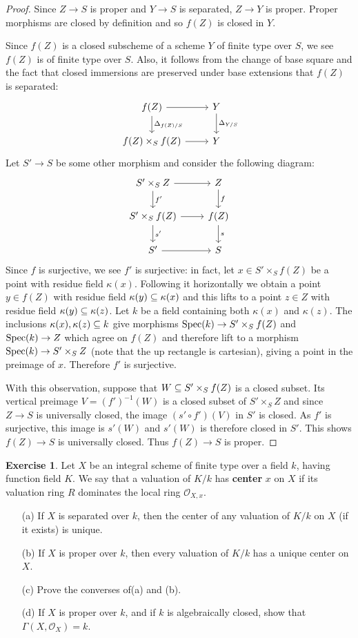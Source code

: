 \documentclass[11pt]{book}
\theoremstyle{definition}
\newtheorem{exercise}{Exercise}[section]
\begin{document}
\begin{proof}
Since $Z\to S$ is proper and $Y\to S$ is separated, $Z\to Y$ is proper. Proper morphisms are closed by definition and so $f(Z)$ is closed in $Y$.\par
Since $f(Z)$ is a closed subscheme of a scheme $Y$ of finite type over $S$, we see $f(Z)$ is of finite type over $S$. Also, it follows from the change of base square and the fact that closed immersions are preserved under base extensions that $f(Z)$ is separated:
\[\begin{tikzcd}
f(Z)\ar[r]\ar[d,"\Delta_{f(Z)/S}"]&Y\ar[d,"\Delta_{Y/S}"]\\
f(Z)\times_Sf(Z)\ar[r]&Y
\end{tikzcd}\]
Let $S'\to S$ be some other morphism and consider the following diagram:
\[\begin{tikzcd}
S'\times_SZ\ar[d,"f'"]\ar[r]&Z\ar[d,"f"]\\
S'\times_Sf(Z)\ar[r]\ar[d,"s'"]&f(Z)\ar[d,"s"]\\
S'\ar[r]&S
\end{tikzcd}\]
Since $f$ is surjective, we see $f'$ is surjective: in fact, let $x\in S'\times_Sf(Z)$ be a point with residue field $\kappa(x)$. Following it horizontally we obtain a point $y\in f(Z)$ with residue field $\kappa(y)\subseteq\kappa(x)$ and this lifts to a point $z\in Z$ with residue field $\kappa(y)\subseteq\kappa(z)$. Let $k$ be a field containing both $\kappa(x)$ and $\kappa(z)$. The inclusions $\kappa(x),\kappa(z)\subseteq k$ give morphisms $\mathrm{Spec}(k)\to S'\times_Sf(Z)$ and $\mathrm{Spec}(k)\to Z$ which agree on $f(Z)$ and therefore lift to a morphism $\mathrm{Spec}(k)\to S'\times_SZ$ (note that the up rectangle is cartesian), giving a point in the preimage of $x$. Therefore $f'$ is surjective.\par
With this observation, suppose that $W\subseteq S'\times_Sf(Z)$ is a closed subset. Its vertical preimage $V=(f')^{-1}(W)$ is a closed subset of $S'\times_SZ$ and since $Z\to S$ is universally closed, the image $(s'\circ f')(V)$ in $S'$ is closed. As $f'$ is surjective, this image is $s'(W)$ and $s'(W)$ is therefore closed in $S'$. This shows $f(Z)\to S$ is universally closed. Thus $f(Z)\to S$ is proper.
\end{proof}
\begin{exercise}
Let $X$ be an integral scheme of finite type over a field $k$, having function field $K$. We say that a valuation of $K/k$ has \textbf{center} $x$ on $X$ if its valuation ring $R$ dominates the local ring $\mathscr{O}_{X,x}$.
\begin{itemize}
\item[(a)] If $X$ is separated over $k$, then the center of any valuation of $K/k$ on $X$ (if it exists) is unique.
\item[(b)] If $X$ is proper over $k$, then every valuation of $K/k$ has a unique center on $X$.
\item[(c)] Prove the converses of(a) and (b).
\item[(d)] If $X$ is proper over $k$, and if $k$ is algebraically closed, show that $\Gamma(X,\mathscr{O}_X)=k$.
\end{itemize}
\end{exercise}
\end{document}
